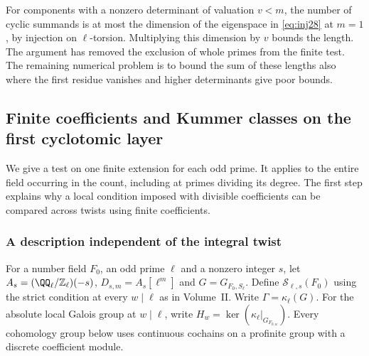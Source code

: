 \documentclass[a4paper,11pt]{article}
\theoremstyle{definition}
\theoremstyle{remark}
\newcommand{\ZZ}{\mathbb Z}\newcommand{\ord}{\operatorname{ord}}
\numberwithin{equation}{section}
\newcommand{\Sel}{\mathcal S}
\begin{document}
For components with a nonzero determinant of valuation \(v<m\), the number of cyclic summands is at most the dimension of the eigenspace in \eqref{eq:inj28} at \(m=1\), by injection on \(\ell\)-torsion. Multiplying this dimension by \(v\) bounds the length. The argument has removed the exclusion of whole primes from the finite test. The remaining numerical problem is to bound the sum of these lengths also where the first residue vanishes and higher determinants give poor bounds.

\subsection{Finite coefficients and Kummer classes on the first cyclotomic layer}\label{nav:III-07}
\label{sec:period30}

We give a test on one finite extension for each odd prime. It applies to the entire field occurring in the count, including at primes dividing its degree. The first step explains why a local condition imposed with divisible coefficients can be compared across twists using finite coefficients.

\subsubsection{A description independent of the integral twist}\label{nav:III-08}
For a number field \(F_0\), an odd prime \(\ell\) and a nonzero integer \(s\), let \(A_s=(\QQ_\ell/\ZZ_\ell)(-s)\), \(D_{s,m}=A_s[\ell^m]\) and \(G=G_{F_0,S_\ell}\). Define \(\Sel_{\ell,s}(F_0)\) using the strict condition at every \(w\mid\ell\) as in Volume~II. Write \(\Gamma=\kappa_\ell(G)\). For the absolute local Galois group at \(w\mid\ell\), write \(H_w=\ker(\kappa_\ell|_{G_{F_{0,w}}})\). Every cohomology group below uses continuous cochains on a profinite group with a discrete coefficient module.
\end{document}
